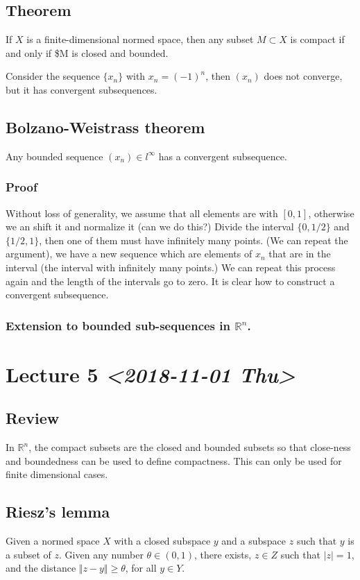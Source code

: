 \documentclass[11pt]{article}
\def\R{\mathbb{R}}
\begin{document}
\subsection{Theorem}
\label{sec:org3b2b92e}
If \(X\) is a finite-dimensional normed space, then any subset \(M \subset X\)
is compact if and only if \$M is closed and bounded.

Consider the sequence \(\{x_n\}\) with \(x_n = (-1)^n\), then \((x_n)\) does not
converge, but it has convergent subsequences.
\subsection{Bolzano-Weistrass theorem}
\label{sec:org6f7fb33}
Any bounded sequence \((x_n) \in l^{\infty}\) has a convergent subsequence.
\subsubsection{Proof}
\label{sec:org9b18573}
Without loss of generality, we assume that all elements are with \([0, 1]\),
otherwise we an shift it and normalize it (can we do this?) Divide the
interval \(\{0, 1/2\}\) and \(\{1/2, 1\}\), then one of them must have
infinitely many points. (We can repeat the argument), we have a new sequence
which are elements of \(x_n\) that are in the interval (the interval with
infinitely many points.) We can repeat this process again and the length of
the intervals go to zero. It is clear how to construct a convergent
subsequence.
\subsubsection{Extension to bounded sub-sequences in \(\R^n\).}
\label{sec:org36127e2}
\section{Lecture 5 \textit{<2018-11-01 Thu>}}
\label{sec:org36f887e}
\subsection{Review}
\label{sec:orga21ae16}
In \(\R^n\), the compact subsets are the closed and bounded subsets so that
close-ness and boundedness can be used to define compactness. This can only
be used for finite dimensional cases.
\subsection{Riesz's lemma}
\label{sec:org8f4dac7}
Given a normed space \(X\) with a closed subspace \(y\) and a subspace \(z\) such
that \(y\) is a subset of \(z\). Given any number \(\theta\in (0, 1)\), there
exists, \(z\in Z\) such that \(\vert z \vert = 1\), and the distance \(\Vert z - y
   \Vert \ge \theta\), for all \(y \in Y\).
\end{document}
